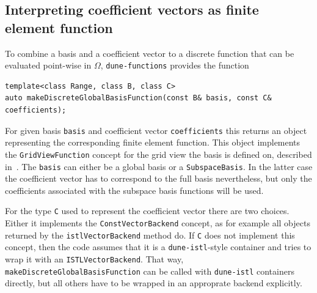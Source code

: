 \documentclass[a4paper,10pt,headings=normal,bibliography=totoc]{scrartcl}
\newcommand{\cpp}[1]{\lstinline[basicstyle=\ttfamily]!#1!}
\newcommand{\dunemodule}[1]{\texttt{#1}}
\begin{document}
\subsection{Interpreting coefficient vectors as finite element function}

To combine a basis and a coefficient vector to a discrete function that
can be evaluated point-wise in $\Omega$, \cpp{dune-functions} provides
the function
%
\begin{lstlisting}[style=Interface]
template<class Range, class B, class C>
auto makeDiscreteGlobalBasisFunction(const B& basis, const C& coefficients);
\end{lstlisting}
%
For given basis \cpp{basis} and coefficient vector \cpp{coefficients}
this returns an object representing the corresponding
finite element function. This object implements the \cpp{GridViewFunction}
concept for the grid view the basis is defined on, described in~\cite{engwer_graeser_muething_sander:2015}.
The \cpp{basis} can either be a global basis or
a \cpp{SubspaceBasis}.  In the latter case the coefficient
vector has to correspond to the full basis nevertheless, but only
the coefficients associated with the subspace basis functions
will be used.

For the type \cpp{C} used to represent the coefficient vector there are two choices.
Either it implements the \cpp{ConstVectorBackend} concept, as for example all objects
returned by the \cpp{istlVectorBackend} method do.  If \cpp{C} does not implement
this concept, then the code assumes that it is a \dunemodule{dune-istl}-style
container and tries to wrap it with an \cpp{ISTLVectorBackend}.
That way, \cpp{makeDiscreteGlobalBasisFunction} can be called with \dunemodule{dune-istl}
containers directly, but all others have to be wrapped in an approprate backend
explicitly.
\end{document}
